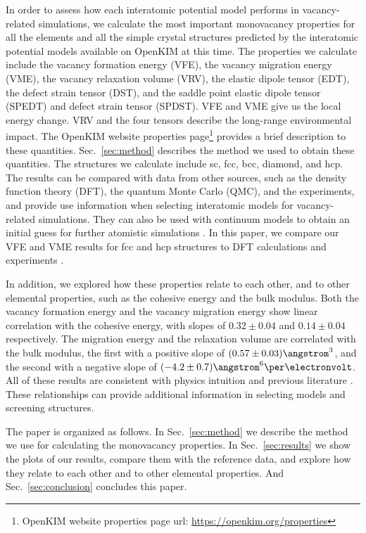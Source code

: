 \documentclass[%
 reprint,
 nofootinbib,
 amsmath,amssymb,
 aps,
]{revtex4-1}
\begin{document}


In order to assess how each interatomic potential model performs in vacancy-related simulations, we calculate the most important monovacancy properties for all the elements and all the simple crystal structures predicted by the interatomic potential models available on OpenKIM at this time.
The properties we calculate include the vacancy formation energy (VFE), the vacancy migration energy (VME), the vacancy relaxation volume (VRV), the elastic dipole tensor (EDT), the defect strain tensor (DST), and the saddle point elastic dipole tensor (SPEDT) and defect strain tensor (SPDST).
VFE and VME give us the local energy change.
VRV and the four tensors describe the long-range environmental impact.
The OpenKIM website properties page\footnote{OpenKIM website properties page url: \url{https://openkim.org/properties}} provides a brief description to these quantities.
Sec.~\ref{sec:method} describes the method we used to obtain these quantities.
The structures we calculate include sc, fcc, bcc, diamond, and hcp.
The results can be compared with data from other sources, such as the density function theory (DFT), the quantum Monte Carlo (QMC), and the experiments, and provide use information when selecting interatomic models for vacancy-related simulations.
They can also be used with continuum models to obtain an initial guess for further atomistic simulations \cite{bozhevolnyi2001multiple}.
In this paper, we compare our VFE and VME results for fcc and hcp structures to DFT calculations and experiments \cite{angsten2014elemental}.

In addition, we explored how these properties relate to each other, and to other elemental properties, such as the cohesive energy and the bulk modulus.
Both the vacancy formation energy and the vacancy migration energy show linear correlation with the cohesive energy, with slopes of $0.32\pm0.04$ and $0.14\pm0.04$ respectively.
The migration energy and the relaxation volume are correlated with the bulk modulus, the first with a positive slope of $(0.57\pm0.03)\angstrom^3$, and the second with a negative slope of $(-4.2\pm0.7)\angstrom^6\per\electronvolt$.
All of these results are consistent with physics intuition and previous literature \cite{angsten2014elemental}.
These relationships can provide additional information in selecting models and screening structures.

The paper is organized as follows.
In Sec.~\ref{sec:method} we describe the method we use for calculating the monovacancy properties.
In Sec.~\ref{sec:results} we show the plots of our results, compare them with the reference data, and explore how they relate to each other and to other elemental properties.
And Sec.~\ref{sec:conclusion} concludes this paper.
\end{document}
